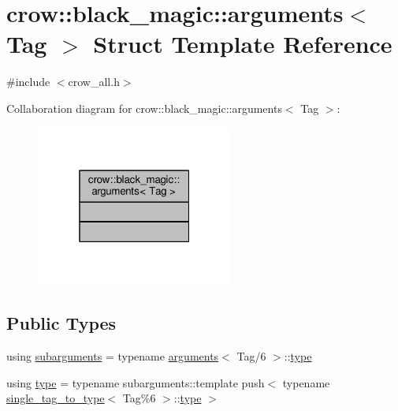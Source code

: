 \hypertarget{structcrow_1_1black__magic_1_1arguments}{\section{crow\-:\-:black\-\_\-magic\-:\-:arguments$<$ Tag $>$ Struct Template Reference}
\label{structcrow_1_1black__magic_1_1arguments}
}


{\ttfamily \#include $<$crow\-\_\-all.\-h$>$}



Collaboration diagram for crow\-:\-:black\-\_\-magic\-:\-:arguments$<$ Tag $>$\-:
\nopagebreak
\begin{figure}[H]
\begin{center}
\leavevmode
\includegraphics[width=184pt]{structcrow_1_1black__magic_1_1arguments__coll__graph}
\end{center}
\end{figure}
\subsection*{Public Types}
\begin{DoxyCompactItemize}
\item 
using \hyperlink{structcrow_1_1black__magic_1_1arguments_a3f85c27b3f73489df979871463b062f6}{subarguments} = typename \hyperlink{structcrow_1_1black__magic_1_1arguments}{arguments}$<$ Tag/6 $>$\-::\hyperlink{structcrow_1_1black__magic_1_1arguments_a6aa2de44853bc54fdf1b8e8756e2612c}{type}
\item 
using \hyperlink{structcrow_1_1black__magic_1_1arguments_a6aa2de44853bc54fdf1b8e8756e2612c}{type} = typename subarguments\-::template push$<$ typename \hyperlink{structcrow_1_1black__magic_1_1single__tag__to__type}{single\-\_\-tag\-\_\-to\-\_\-type}$<$ Tag\%6 $>$\-::\hyperlink{structcrow_1_1black__magic_1_1arguments_a6aa2de44853bc54fdf1b8e8756e2612c}{type} $>$
\end{DoxyCompactItemize}


